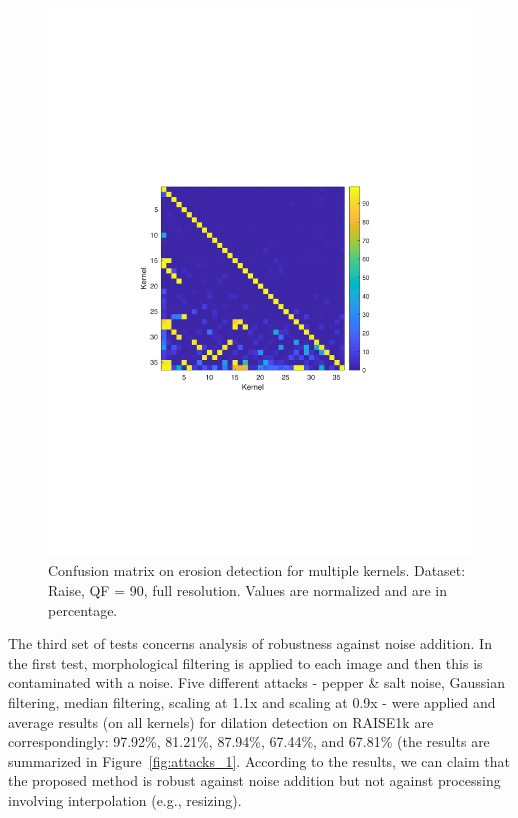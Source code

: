 \documentclass{ieeeaccess}
\begin{document}
\begin{figure}[b!]
	\centering
	\includegraphics[width=\linewidth]{confusion_matrix}
	\caption{Confusion matrix on erosion detection for multiple kernels. Dataset: Raise, QF = 90, full resolution. Values are normalized and are in percentage.}
	\label{fig:confusion}
\end{figure}

The third set of tests concerns analysis of robustness against noise addition. In the first test, morphological filtering is applied to each image and then this is contaminated with a noise. Five different attacks - pepper \& salt noise, Gaussian filtering, median filtering, scaling at 1.1x and scaling at 0.9x - were applied and average results (on all kernels) for dilation detection on RAISE1k are correspondingly: 97.92\%, 81.21\%, 87.94\%, 67.44\%, and 67.81\% (the results are summarized in Figure~\ref{fig:attacks_1}. According to the results, we can claim that the proposed method is robust against noise addition but not against processing involving interpolation (e.g., resizing). 
\end{document}
